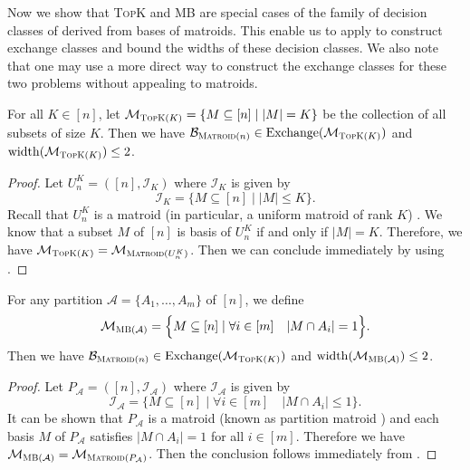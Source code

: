 \documentclass{article}
\newcommand{\M}{\mathcal M}
\newcommand{\B}{\mathcal B}
\DeclareMathOperator{\rank}{width}
\DeclareMathOperator{\Exchange}{Exchange}
\newcommand{\MultiIdent}{\textsc{TopK}\xspace}
\newcommand{\MultiBandit}{\textsc{MB}\xspace}
\newcommand{\Matroid}{\textsc{Matroid}\xspace}
\begin{document}
Now we show that \MultiIdent and \MultiBandit are special cases of the family of decision classes of derived from bases of matroids. 
This enable us to apply  to construct exchange classes and bound the widths of these decision classes.
We also note that one may use a more direct way to construct the exchange classes for these two problems without appealing to matroids.


\begin{fact}[\MultiIdent]
\label{fact:topk}
For all $K \in [n]$, let $\M_{\MultiIdent(K)} = \{M\subseteq [n] \mid |M| = K\}$ be the collection of all subsets of size $K$.
Then we have $\B_{\Matroid(n)} \in \Exchange(\M_{\MultiIdent(K)})$ and $\rank(\M_{\MultiIdent(K)}) \le 2$.
\end{fact}
\begin{proof}
Let $U_n^K = ([n], \mathcal I_{K})$ where $\mathcal I_K$ is given by
$$
\mathcal I_K = \big\{M\subseteq[n] \mid |M| \le K\}.
$$
Recall that $U_n^K$ is a matroid (in particular, a uniform matroid of rank $K$) \citep{oxley2006matroid}.
We know that a subset $M$ of $[n]$ is basis of $U_n^K$ if and only if $|M|=K$.
Therefore, we have $\M_{\MultiIdent(K)}=\M_{\Matroid(U_n^K)}$. 
Then we can conclude immediately by using .
\end{proof}


\begin{fact}[\MultiBandit]
\label{fact:multibandit}
For any partition $\mathcal A =\{A_1,\ldots,A_m\}$ of $[n]$, we define
$$\M_{\MultiBandit(\mathcal A)} = \Big\{M\subseteq [n] \mid \forall i\in[m] \quad |M\cap A_i| = 1\Big\}.$$
Then we have $\B_{\Matroid(n)} \in \Exchange(\M_{\MultiIdent(K)})$ and  $\rank(\M_{\MultiBandit(\mathcal A)}) \le 2$.
\end{fact}

\begin{proof}
Let $P_{\mathcal A}=([n], \mathcal I_{\mathcal A})$ where $\mathcal I_{\mathcal A}$ is given by
$$
\mathcal I_{\mathcal A} = \big\{M \subseteq [n] \mid \forall i\in[m] \quad |M\cap A_i| \le 1 \big\}.
$$
It can be shown that $P_{\mathcal A}$ is a matroid (known as partition matroid \citep{oxley2006matroid}) and each basis $M$ of $P_{\mathcal A}$
satisfies $|M\cap A_i| = 1$ for all $i\in [m]$.
Therefore we have $\M_{\MultiBandit(\mathcal A)}=\M_{\Matroid(P_{\mathcal A})}$. 
Then the conclusion follows immediately from .
\end{proof}
\end{document}
